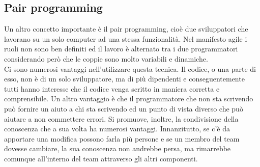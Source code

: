 \subsection{Pair programming}
Un altro concetto importante è il pair programming, cioè due sviluppatori che lavorano su un solo computer ad una stessa funzionalità.
Nel manifesto agile i ruoli non sono ben definiti ed il lavoro è alternato tra i due programmatori considerando però che le coppie sono molto variabili e dinamiche.\\
Ci sono numerosi vantaggi nell'utilizzare questa tecnica.
Il codice, o una parte di esso, non è di un solo sviluppatore, ma di più dipendenti e conseguentemente tutti hanno interesse che il codice venga scritto in maniera corretta e comprensibile.
Un altro vantaggio è che il programmatore che non sta scrivendo può fornire un aiuto a chi sta scrivendo ed un punto di vista diverso che può aiutare a non commettere errori.
Si promuove, inoltre, la condivisione della conoscenza che a sua volta ha numerosi vantaggi.
Innanzitutto, se c'è da apportare una modifica possono farla più persone e se un membro del team dovesse cambiare, la sua conoscenza non andrebbe persa, ma rimarrebbe comunque all'interno del team attraverso gli altri componenti.


